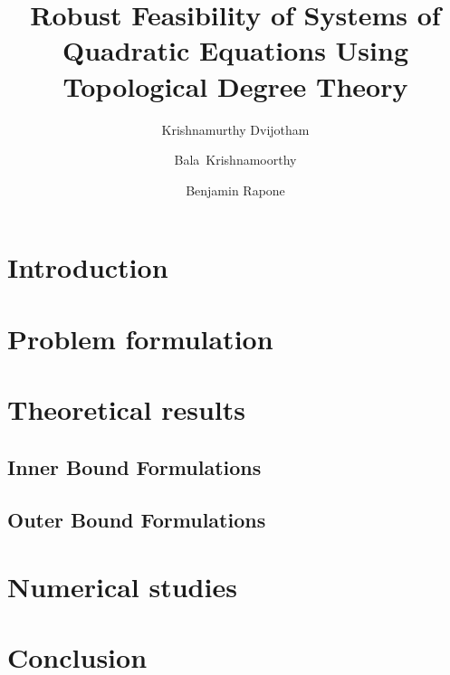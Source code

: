 \documentclass[11pt]{article}
\title{Robust Feasibility of Systems of Quadratic Equations Using Topological Degree Theory}
\author[*]{Krishnamurthy Dvijotham}
\author[**]{Bala~Krishnamoorthy}
\author[**]{Benjamin Rapone}
\affil[*]{Google DeepMind}
\affil[**]{Wahington State University}
\theoremstyle{plain}
\theoremstyle{definition}
\theoremstyle{remark}
\begin{document}
\maketitle



\section{Introduction}
  


\section{Problem formulation}



\section{Theoretical results}



\subsection{Inner Bound Formulations}



\subsection{Outer Bound Formulations}



\section{Numerical studies}



\section{Conclusion}




\end{document}
